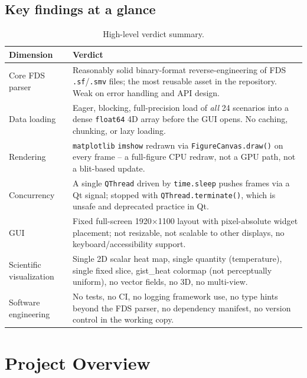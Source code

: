 \documentclass[11pt,a4paper]{report}
\begin{document}
\section{Key findings at a glance}

\begin{table}[h]
\centering
\begin{tabular}{p{4.2cm}p{9.3cm}}
\toprule
\textbf{Dimension} & \textbf{Verdict} \\
\midrule
Core FDS parser & Reasonably solid binary-format reverse-engineering of FDS \texttt{.sf}/\texttt{.smv} files;
the most reusable asset in the repository. Weak on error handling and API design. \\
Data loading & Eager, blocking, full-precision load of \emph{all} 24 scenarios into a dense
\texttt{float64} 4D array before the GUI opens. No caching, chunking, or lazy loading. \\
Rendering & \texttt{matplotlib} \texttt{imshow} redrawn via \texttt{FigureCanvas.draw()} on every
frame -- a full-figure CPU redraw, not a GPU path, not a blit-based update. \\
Concurrency & A single \texttt{QThread} driven by \texttt{time.sleep} pushes frames via a Qt signal;
stopped with \texttt{QThread.terminate()}, which is unsafe and deprecated practice in Qt. \\
GUI & Fixed full-screen 1920$\times$1100 layout with pixel-absolute widget placement; not
resizable, not scalable to other displays, no keyboard/accessibility support. \\
Scientific visualization & Single 2D scalar heat map, single quantity (temperature), single fixed
slice, gist\_heat colormap (not perceptually uniform), no vector fields, no 3D, no multi-view. \\
Software engineering & No tests, no CI, no logging framework use, no type hints beyond the FDS
parser, no dependency manifest, no version control in the working copy. \\
\bottomrule
\end{tabular}
\caption{High-level verdict summary.}
\end{table}

\chapter{Project Overview}
\end{document}
